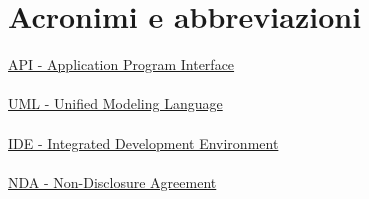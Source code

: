 \chapter{Acronimi e abbreviazioni}


\noindent \hyperref[API]{API - Application Program Interface}
\\
\\
\noindent \hyperref[UML]{UML - Unified Modeling Language}
\\
\\
\noindent \hyperref[IDE]{IDE - Integrated Development Environment}
\\
\\
\noindent \hyperref[NDA]{NDA - Non-Disclosure Agreement}
\\
\\


